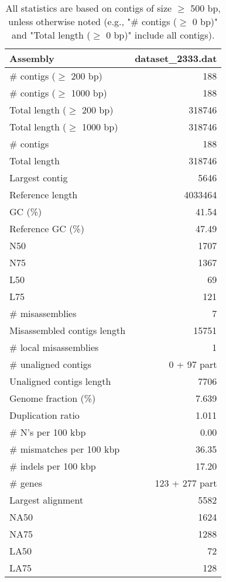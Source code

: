 \documentclass[12pt,a4paper]{article}
\begin{document}
\begin{table}[ht]
\begin{center}
\caption{All statistics are based on contigs of size $\geq$ 500 bp, unless otherwise noted (e.g., "\# contigs ($\geq$ 0 bp)" and "Total length ($\geq$ 0 bp)" include all contigs).}
\begin{tabular}{|l*{1}{|r}|}
\hline
Assembly & dataset\_2333.dat \\ \hline
\# contigs ($\geq$ 200 bp) & 188 \\ \hline
\# contigs ($\geq$ 1000 bp) & 188 \\ \hline
Total length ($\geq$ 200 bp) & 318746 \\ \hline
Total length ($\geq$ 1000 bp) & 318746 \\ \hline
\# contigs & 188 \\ \hline
Total length & 318746 \\ \hline
Largest contig & 5646 \\ \hline
Reference length & 4033464 \\ \hline
GC (\%) & 41.54 \\ \hline
Reference GC (\%) & 47.49 \\ \hline
N50 & 1707 \\ \hline
N75 & 1367 \\ \hline
L50 & 69 \\ \hline
L75 & 121 \\ \hline
\# misassemblies & 7 \\ \hline
Misassembled contigs length & 15751 \\ \hline
\# local misassemblies & 1 \\ \hline
\# unaligned contigs & 0 + 97 part \\ \hline
Unaligned contigs length & 7706 \\ \hline
Genome fraction (\%) & 7.639 \\ \hline
Duplication ratio & 1.011 \\ \hline
\# N's per 100 kbp & 0.00 \\ \hline
\# mismatches per 100 kbp & 36.35 \\ \hline
\# indels per 100 kbp & 17.20 \\ \hline
\# genes & 123 + 277 part \\ \hline
Largest alignment & 5582 \\ \hline
NA50 & 1624 \\ \hline
NA75 & 1288 \\ \hline
LA50 & 72 \\ \hline
LA75 & 128 \\ \hline
\end{tabular}
\end{center}
\end{table}
\end{document}
